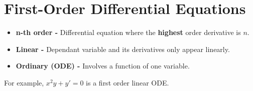 \documentclass[../main.tex]{subfiles}
\begin{document}
\chapter{First-Order Differential Equations}
\begin{remark}[Terminology]
  \begin{itemize}
    \item \textbf{n-th order - } Differential equation where the \textbf{highest} order derivative is $n$.
    \item \textbf{Linear -} Dependant variable and its derivatives only appear linearly.
    \item \textbf{Ordinary (ODE) -} Involves a function of one variable.
  \end{itemize}
  \begin{example}
    For example, $x^2y + y' = 0$ is a first order linear ODE.
  \end{example}
\end{remark}
\end{document}
